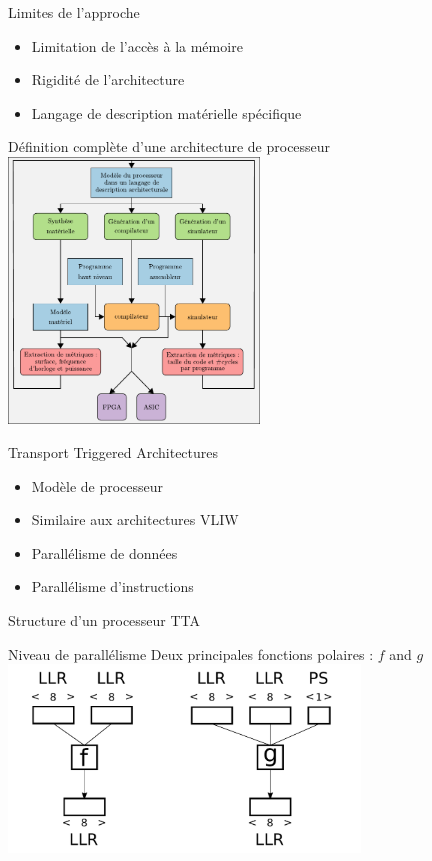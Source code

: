 \begin{frame}[c]{Limites de l'approche}
  \begin{itemize}
    \vfill
    \item Limitation de l'accès à la mémoire
    \vfill
    \item Rigidité de l'architecture
    \vfill
    \item Langage de description matérielle spécifique
    \vfill
  \end{itemize}
\end{frame}

\begin{frame}[c]{Définition complète d'une architecture de processeur}
  \centering
  \includegraphics[width=0.5\textwidth]{./fig/methodos-2}
\end{frame}

\begin{frame}[c]{Transport Triggered Architectures}
  \begin{itemize}
    \vfill
    \item Modèle de processeur
    \vfill
    \item Similaire aux architectures VLIW
    \vfill
    \item Parallélisme de données
    \vfill
    \item Parallélisme d'instructions
    \vfill
  \end{itemize}
\end{frame}

\begin{frame}[c]{Structure d'un processeur TTA}
\centering
\end{frame}

\begin{frame}[c]{Niveau de parallélisme}
  \centering
  \vfill
  Deux principales fonctions polaires : $f$ and $g$
  \vfill
  \includegraphics[width=0.7\textwidth]{fig/f_g_dimensions_scalar}
  \vfill
\end{frame}


